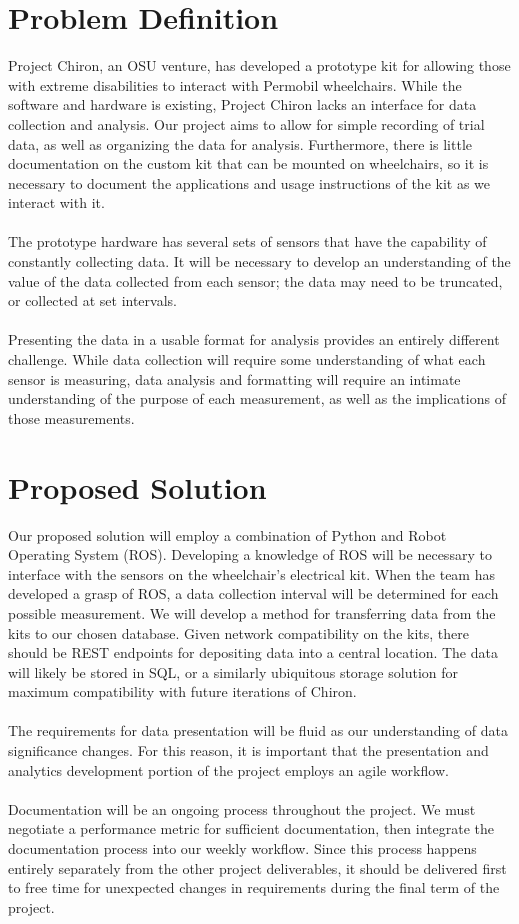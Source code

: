 \documentclass[onecolumn, draftclsnofoot,10pt, compsoc]{IEEEtran}
\begin{document}
\section{Problem Definition}
Project Chiron, an OSU venture, has developed a prototype kit for allowing those with extreme disabilities to interact with Permobil wheelchairs. While the software and hardware is existing, Project Chiron lacks an interface for data collection and analysis. Our project aims to allow for simple recording of trial data, as well as organizing the data for analysis. Furthermore, there is little documentation on the custom kit that can be mounted on wheelchairs, so it is necessary to document the applications and usage instructions of the kit as we interact with it.
\\\\
The prototype hardware has several sets of sensors that have the capability of constantly collecting data. It will be necessary to develop an understanding of the value of the data collected from each sensor; the data may need to be truncated, or collected at set intervals.
\\\\
Presenting the data in a usable format for analysis provides an entirely different challenge. While data collection will require some understanding of what each sensor is measuring, data analysis and formatting will require an intimate understanding of the purpose of each measurement, as well as the implications of those measurements.


\section{Proposed Solution}
	Our proposed solution will employ a combination of Python and Robot Operating System (ROS). Developing a knowledge of ROS will be necessary to interface with the sensors on the wheelchair’s electrical kit. When the team has developed a grasp of ROS, a data collection interval will be determined for each possible measurement. We will develop a method for transferring data from the kits to our chosen database. Given network compatibility on the kits, there should be REST endpoints for depositing data into a central location. The data will likely be stored in SQL, or a similarly ubiquitous storage solution for maximum compatibility with future iterations of Chiron.
	\\\\
The requirements for data presentation will be fluid as our understanding of data significance changes. For this reason, it is important that the presentation and analytics development portion of the project employs an agile workflow.
\\\\
Documentation will be an ongoing process throughout the project. We must negotiate a performance metric for sufficient documentation, then integrate the documentation process into our weekly workflow. Since this process happens entirely separately from the other project deliverables, it should be delivered first to free time for unexpected changes in requirements during the final term of the project.
\end{document}
